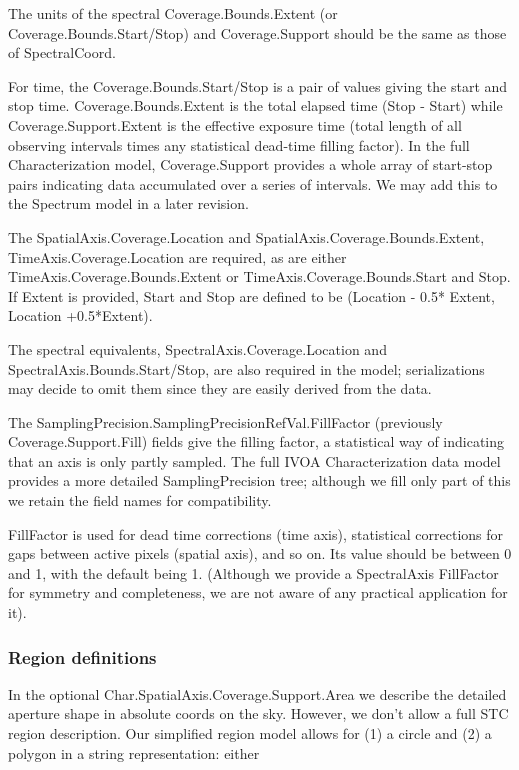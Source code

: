 \documentclass[11pt]{article}
\begin{document}
The units of the spectral Coverage.Bounds.Extent (or Coverage.Bounds.Start/Stop) 
and Coverage.Support should be the same as those of SpectralCoord.

    
For time, the Coverage.Bounds.Start/Stop is a pair of values giving the start and stop time.
Coverage.Bounds.Extent is the total elapsed time (Stop - Start) while Coverage.Support.Extent
is the effective exposure time (total length of all observing intervals times any statistical
dead-time
filling factor).
In the full Characterization model,
Coverage.Support provides a whole array of start-stop pairs indicating data
accumulated over a series of intervals. We may add this to the Spectrum model
in a later revision.

The SpatialAxis.Coverage.Location 
and  SpatialAxis.Coverage.Bounds.Extent, 
TimeAxis.Coverage.Location are required, as are
either  TimeAxis.Coverage.Bounds.Extent or TimeAxis.Coverage.Bounds.Start and Stop.
If Extent is provided, Start and Stop are defined to be (Location - 0.5* Extent,
Location +0.5*Extent).

The spectral equivalents, SpectralAxis.Coverage.Location and
SpectralAxis.Bounds.Start/Stop, are also required in the model;
serializations may decide to omit them since they  are easily derived from the data.


The SamplingPrecision.SamplingPrecisionRefVal.FillFactor
(previously Coverage.Support.Fill) fields give the filling factor, a statistical
way of indicating that an axis is only partly sampled. The full
IVOA Characterization data model provides a more detailed SamplingPrecision
tree; although we fill only part of this we retain the field names
for compatibility.

FillFactor is used 
for dead time corrections (time axis), statistical corrections for gaps
between active pixels (spatial axis),  and so on. Its value should be
between 0 and 1, with the default being 1. (Although we provide a
SpectralAxis FillFactor for symmetry and completeness, we are not
aware of any practical application for it).


\subsubsection{Region definitions}

In the optional Char.SpatialAxis.Coverage.Support.Area we describe the detailed aperture shape
in absolute coords on the sky. However, we don't allow a full STC region description.
Our simplified region model allows for 
(1) a circle and (2) a polygon in a string representation: either
\end{document}
